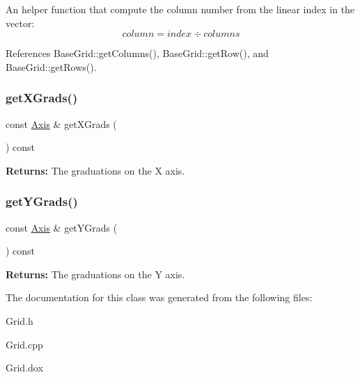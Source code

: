 An helper function that compute the column number from the linear index in the vector\+: \[ column = index \div columns \] 

References Base\+Grid\+::get\+Columns(), Base\+Grid\+::get\+Row(), and Base\+Grid\+::get\+Rows().

\mbox{\label{classKatabatic_1_1BaseGrid_a1e3eea49f6f58fb8d0b3fa73f5cf3fd7}} 
\subsubsection{\texorpdfstring{get\+X\+Grads()}{getXGrads()}}
{\footnotesize\ttfamily const \hyperlink{classKatabatic_1_1BaseGrid_1_1Axis}{Axis} \& get\+X\+Grads (\begin{DoxyParamCaption}{ }\end{DoxyParamCaption}) const\hspace{0.3cm}{\ttfamily [inline]}}

{\bfseries Returns\+:} The graduations on the X axis. \mbox{\label{classKatabatic_1_1BaseGrid_ab11d8b83eaa19f5fe6fecc63a8bb203e}} 
\subsubsection{\texorpdfstring{get\+Y\+Grads()}{getYGrads()}}
{\footnotesize\ttfamily const \hyperlink{classKatabatic_1_1BaseGrid_1_1Axis}{Axis} \& get\+Y\+Grads (\begin{DoxyParamCaption}{ }\end{DoxyParamCaption}) const\hspace{0.3cm}{\ttfamily [inline]}}

{\bfseries Returns\+:} The graduations on the Y axis. 

The documentation for this class was generated from the following files\+:\begin{DoxyCompactItemize}
\item 
Grid.\+h\item 
Grid.\+cpp\item 
Grid.\+dox\end{DoxyCompactItemize}
